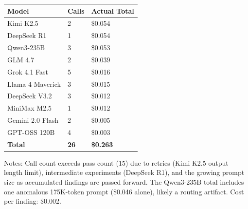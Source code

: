 \documentclass[
]{article}
\begin{document}
\begin{longtable}[]{@{}lll@{}}
\toprule\noalign{}
Model & Calls & Actual Total \\
\midrule\noalign{}
\endhead
\bottomrule\noalign{}
\endlastfoot
Kimi K2.5 & 2 & \$0.054 \\
DeepSeek R1 & 1 & \$0.054 \\
Qwen3-235B & 3 & \$0.053 \\
GLM 4.7 & 2 & \$0.039 \\
Grok 4.1 Fast & 5 & \$0.016 \\
Llama 4 Maverick & 3 & \$0.015 \\
DeepSeek V3.2 & 3 & \$0.012 \\
MiniMax M2.5 & 1 & \$0.012 \\
Gemini 2.0 Flash & 2 & \$0.005 \\
GPT-OSS 120B & 4 & \$0.003 \\
\textbf{Total} & \textbf{26} & \textbf{\$0.263} \\
\end{longtable}

Notes: Call count exceeds pass count (15) due to retries (Kimi K2.5
output length limit), intermediate experiments (DeepSeek R1), and the
growing prompt size as accumulated findings are passed forward. The
Qwen3-235B total includes one anomalous 175K-token prompt (\$0.046
alone), likely a routing artifact. Cost per finding: \$0.002.
\end{document}
